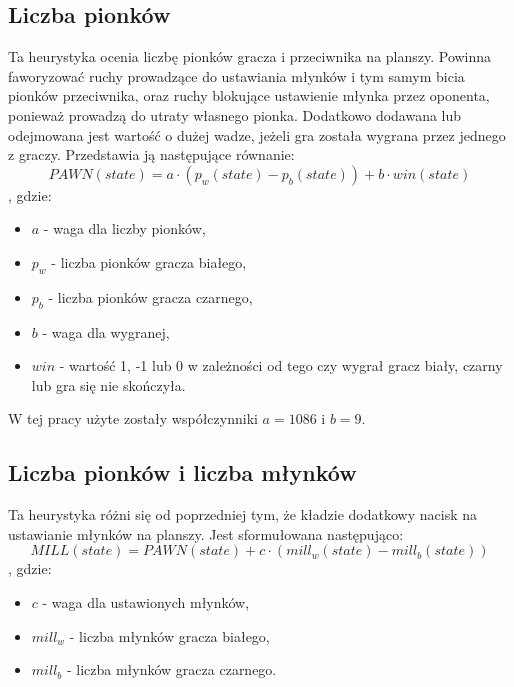 \documentclass{article}
\begin{document}
	\subsection{Liczba pionków}
	Ta heurystyka ocenia liczbę pionków gracza i przeciwnika na planszy. Powinna faworyzować ruchy prowadzące do ustawiania młynków i tym samym bicia pionków przeciwnika, oraz ruchy blokujące ustawienie młynka przez oponenta, ponieważ prowadzą do utraty własnego pionka. Dodatkowo dodawana lub odejmowana jest wartość o dużej wadze, jeżeli gra została wygrana przez jednego z graczy. Przedstawia ją następujące równanie:
	\begin{equation}
		PAWN(state) = a \cdot (p_{w}(state) - p_{b}(state)) + b \cdot win(state)
	\end{equation}
	, gdzie: 
	\begin{itemize}
		\item $a$ - waga dla liczby pionków,
		\item $p_w$ - liczba pionków gracza białego,
		\item $p_b$ - liczba pionków gracza czarnego,
		\item $b$ - waga dla wygranej,
		\item $win$ - wartość 1, -1 lub 0 w zależności od tego czy wygrał gracz biały, czarny lub gra się nie skończyła.
	\end{itemize}
	W tej pracy użyte zostały współczynniki $a = 1086$ i $b = 9$.
	\subsection{Liczba pionków i liczba młynków}
	Ta heurystyka różni się od poprzedniej tym, że kładzie dodatkowy nacisk na ustawianie młynków na planszy. Jest sformułowana następująco:
	\begin{equation}
		MILL(state) = PAWN(state) + c \cdot (mill_w(state) - mill_b(state))
	\end{equation}
	, gdzie:
	\begin{itemize}
		\item $c$ - waga dla ustawionych młynków,
		\item $mill_w$ - liczba młynków gracza białego,
		\item $mill_b$ - liczba młynków gracza czarnego.
	\end{itemize}
\end{document}
